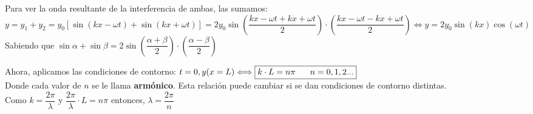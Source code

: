 \documentclass{report}
\begin{document}
\clearpage

    \noindent Para ver la onda resultante de la interferencia de ambas, las sumamos:
    $y=y_1+y_2=y_0\left[\sin(kx-\omega t)+\sin(kx+\omega t)\right]=2y_0\sin\left(
    \dfrac{kx-\omega t+kx+\omega t}{2}\right)\cdot\left(\dfrac{kx-\omega t-kx+\omega 
    t}{2}\right)\Leftrightarrow \boxed{y=2y_0\sin(kx)\cos(\omega t)}$\\ 
    \vspace{0.8cm} Sabiendo que $\sin\alpha+\sin\beta=2\sin\left(\dfrac{\alpha+\beta}{2}
    \right)\cdot\left(\dfrac{\alpha-\beta}{2}\right)$

    \noindent Ahora, aplicamos las condiciones de contorno:
    $t=0, y(x=L) \Longleftrightarrow \boxed{k\cdot L = n\pi\hspace{0.6cm}n=0,1,2...}$\\

    \noindent Donde cada valor de $n$ se le llama \textbf{armónico}. Esta relación 
    puede cambiar si se dan condiciones de contorno distintas.\\
      
    \noindent Como $k=\dfrac{2\pi}{\lambda}$ y $\dfrac{2\pi}{\lambda}\cdot L=n\pi$
    entonces, $\boxed{\lambda=\dfrac{2\pi}{n}}$
    
\end{document}

